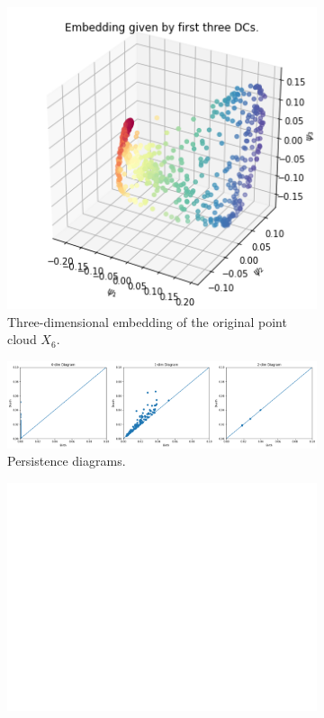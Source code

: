 \begin{figure}[H]
\centering
\begin{subfigure}[b]{0.2\textwidth}
    \includegraphics[width=\textwidth]{figures/topology/X6_embedding.png}
    \caption{Three-dimensional embedding of the original point cloud $X_6$.}
\end{subfigure}
\hfill
\begin{subfigure}[b]{0.75\textwidth}
    \includegraphics[width=\textwidth]{figures/topology/X6_H0.png}
    \caption{Persistence diagrams.}
\end{subfigure}
\begin{subfigure}[b]{0.25\textwidth}
\includegraphics[width=\textwidth]{figures/topology/white.png} 

\end{subfigure}
\end{figure}
